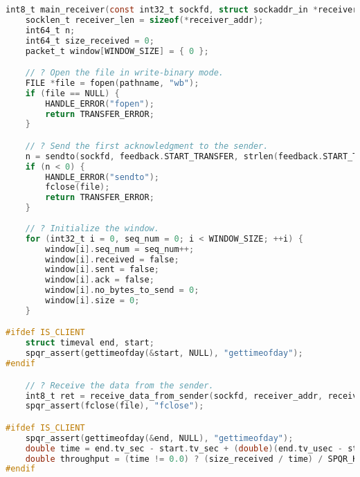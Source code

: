 \begin{lstlisting}[caption={\lstinlinebg{src/protocol.c}},language=C,keywords={puts, DEBUG, SPQR_FILENAME_SUCCESSFULLY_DELETED, remove, strlen, receive_data_from_sender, fopen, for, fread, PACKET_SIZE, break, ifdef, endif, IS_CLIENT, timeval, gettimeofday, send_data_to_receiver, wait_ack, while, true, ack_packet_t, recvfrom, WRITE_BYTE_ERROR, MAX_ERRORS, double, SPQR_KB, FILE_TRANSFER_FAILED, EXIT_SUCCESS, FILE_TRANSFER_COMPLETED, printf, sendto, SEQ_NUM_ERROR, sizeof, int8_t, int32_t, uint16_t, int64_t, struct, sockaddr, sockaddr_in, char, socklen_t, uint32_t, uint64_t, WINDOW_SIZE, stat, fstat, fileno, set_timeout, FILE, NULL, HANDLE_ERROR, return, TRANSFER_ERROR, if, else, perror, exit, fprintf, stderr, MAX_RETRIES, spqr_assert, spqr_free, fclose, free, spqr_assert_ptr, fseek, SEEK_END, ftell, rewind, malloc, memset, sizeof, packet_t, MAX_READ_LINE, MAX_WINDOW_SIZE, MAX_PACKETS, MAX_ACKS}]
int8_t main_receiver(const int32_t sockfd, struct sockaddr_in *receiver_addr, const char *pathname) {
    socklen_t receiver_len = sizeof(*receiver_addr);
    int64_t n;
    int64_t size_received = 0;
    packet_t window[WINDOW_SIZE] = { 0 };

    // ? Open the file in write-binary mode.
    FILE *file = fopen(pathname, "wb");
    if (file == NULL) {
        HANDLE_ERROR("fopen");
        return TRANSFER_ERROR;
    }

    // ? Send the first acknowledgment to the sender.
    n = sendto(sockfd, feedback.START_TRANSFER, strlen(feedback.START_TRANSFER), 0, (struct sockaddr *) receiver_addr, receiver_len);
    if (n < 0) {
        HANDLE_ERROR("sendto");
        fclose(file);
        return TRANSFER_ERROR;
    }
    
    // ? Initialize the window.
    for (int32_t i = 0, seq_num = 0; i < WINDOW_SIZE; ++i) {
        window[i].seq_num = seq_num++;
        window[i].received = false;
        window[i].sent = false;
        window[i].ack = false;
        window[i].no_bytes_to_send = 0;
        window[i].size = 0;
    }

#ifdef IS_CLIENT
    struct timeval end, start;
    spqr_assert(gettimeofday(&start, NULL), "gettimeofday");
#endif

    // ? Receive the data from the sender.
    int8_t ret = receive_data_from_sender(sockfd, receiver_addr, receiver_len, window, &size_received, file);
    spqr_assert(fclose(file), "fclose");

#ifdef IS_CLIENT
    spqr_assert(gettimeofday(&end, NULL), "gettimeofday");
    double time = end.tv_sec - start.tv_sec + (double)(end.tv_usec - start.tv_usec) / 1e6;
    double throughput = (time != 0.0) ? (size_received / time) / SPQR_KB : 0.0; // [kB/s]
#endif


\end{lstlisting}
